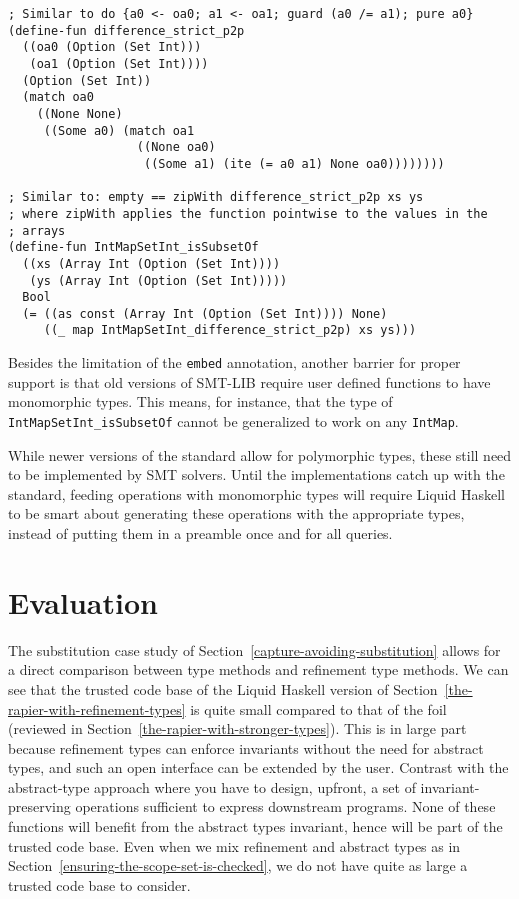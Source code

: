\documentclass[sigconf]{acmart}
\newcommand{\tc}[1]{{\small\texttt{#1}}}
\begin{document}
\begin{verbatim}
; Similar to do {a0 <- oa0; a1 <- oa1; guard (a0 /= a1); pure a0}
(define-fun difference_strict_p2p
  ((oa0 (Option (Set Int)))
   (oa1 (Option (Set Int))))
  (Option (Set Int))
  (match oa0
    ((None None)
     ((Some a0) (match oa1
                  ((None oa0)
                   ((Some a1) (ite (= a0 a1) None oa0))))))))

; Similar to: empty == zipWith difference_strict_p2p xs ys
; where zipWith applies the function pointwise to the values in the
; arrays
(define-fun IntMapSetInt_isSubsetOf
  ((xs (Array Int (Option (Set Int))))
   (ys (Array Int (Option (Set Int)))))
  Bool
  (= ((as const (Array Int (Option (Set Int)))) None)
     ((_ map IntMapSetInt_difference_strict_p2p) xs ys)))
\end{verbatim}

Besides the limitation of the \tc{embed} annotation, another barrier for
proper support is that old versions of SMT-LIB require user defined
functions to have monomorphic types. This means, for instance, that
the type of \tc{IntMapSetInt\_isSubsetOf} cannot be generalized to work
on any \tc{IntMap}.

While newer versions of the standard allow
for polymorphic types, these still need to be implemented by SMT solvers.
Until the implementations catch up with the standard, feeding operations with
monomorphic types will require Liquid Haskell to be smart about generating
these operations with the appropriate types, instead of putting them in a
preamble once and for all queries.


\section{Evaluation}
\label{evaluation}

The substitution case study of Section~\ref{capture-avoiding-substitution}
allows for a direct comparison between type methods and refinement type methods. We
can see that the trusted code base of the Liquid Haskell version of
Section~\ref{the-rapier-with-refinement-types} is quite small compared to that
of the foil~\cite{maclaurin23} (reviewed in
Section~\ref{the-rapier-with-stronger-types}). This is in large part
because refinement types can enforce invariants without the need for
abstract types, and such an open interface can be extended by the user.
Contrast with the abstract-type approach where you have to design, upfront, a
set of invariant-preserving operations sufficient to express downstream programs.
None of these functions will benefit from the abstract types invariant, hence
will be part of the trusted code base. Even when we mix refinement and abstract
types as in Section~\ref{ensuring-the-scope-set-is-checked}, we do not have quite
as large a trusted code base to consider.
\end{document}
